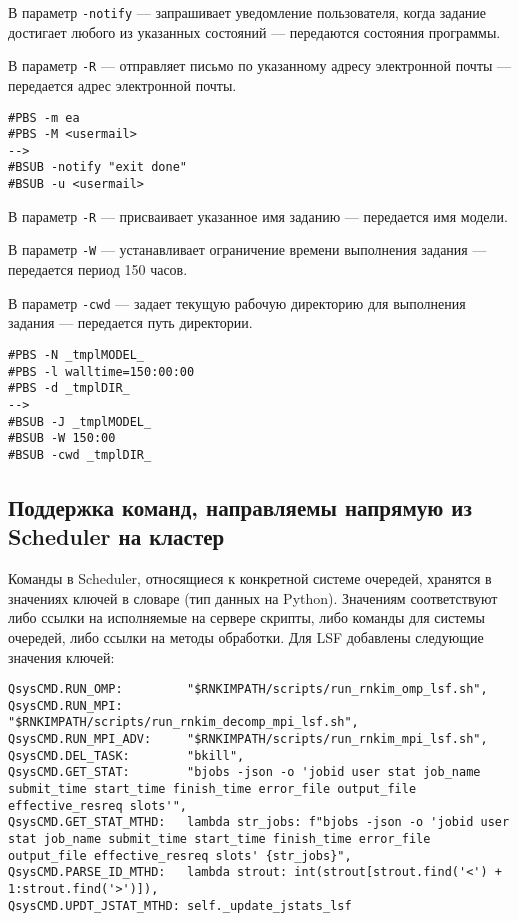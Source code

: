 В параметр \lstinline{-notify} --- запрашивает уведомление пользователя, когда задание достигает любого из указанных состояний --- передаются состояния программы.

В параметр \lstinline{-R} --- отправляет письмо по указанному адресу электронной почты --- передается адрес электронной почты.
\begin{lstlisting}
#PBS -m ea
#PBS -M <usermail>
-->
#BSUB -notify "exit done"
#BSUB -u <usermail>
\end{lstlisting}

В параметр \lstinline{-R} --- присваивает указанное имя заданию --- передается имя модели.

В параметр \lstinline{-W} --- устанавливает ограничение времени выполнения задания --- передается период 150 часов.

В параметр \lstinline{-cwd} --- задает текущую рабочую директорию для выполнения задания --- передается путь директории.
\begin{lstlisting}
#PBS -N _tmplMODEL_
#PBS -l walltime=150:00:00
#PBS -d _tmplDIR_
-->
#BSUB -J _tmplMODEL_
#BSUB -W 150:00
#BSUB -cwd _tmplDIR_
\end{lstlisting}


\subsection{Поддержка команд, направляемы напрямую из Scheduler на кластер}

Команды в Scheduler, относящиеся к конкретной системе очередей, хранятся в значениях ключей в словаре (тип данных на Python). Значениям соответствуют либо ссылки на исполняемые на сервере скрипты, либо команды для системы очередей, либо ссылки на методы обработки. Для LSF добавлены следующие значения ключей:
\begin{lstlisting}
QsysCMD.RUN_OMP:         "$RNKIMPATH/scripts/run_rnkim_omp_lsf.sh",
QsysCMD.RUN_MPI:         "$RNKIMPATH/scripts/run_rnkim_decomp_mpi_lsf.sh",
QsysCMD.RUN_MPI_ADV:     "$RNKIMPATH/scripts/run_rnkim_mpi_lsf.sh",
QsysCMD.DEL_TASK:        "bkill",
QsysCMD.GET_STAT:        "bjobs -json -o 'jobid user stat job_name submit_time start_time finish_time error_file output_file effective_resreq slots'",
QsysCMD.GET_STAT_MTHD:   lambda str_jobs: f"bjobs -json -o 'jobid user stat job_name submit_time start_time finish_time error_file output_file effective_resreq slots' {str_jobs}",
QsysCMD.PARSE_ID_MTHD:   lambda strout: int(strout[strout.find('<') + 1:strout.find('>')]),
QsysCMD.UPDT_JSTAT_MTHD: self._update_jstats_lsf
\end{lstlisting}

